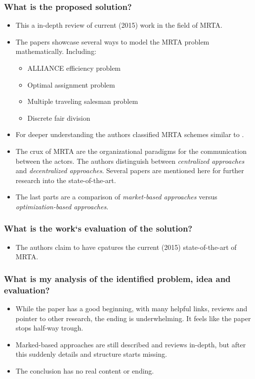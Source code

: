 \subsubsection*{What is the proposed solution?}
\begin{itemize}
    \item This a in-depth review of current (2015) work in the field of MRTA. 
    \item The papers showcase several ways to model the MRTA problem mathematically. Including: \begin{itemize}
        \item ALLIANCE efficiency problem
        \item Optimal assignment problem
        \item Multiple traveling salesman problem
        \item Discrete fair division
    \end{itemize}
    \item For deeper understanding the authors classified MRTA schemes similar to \cite{Gerkey2004}.
    \item The crux of MRTA are the organizational paradigms for the communication between the actors. The authors distinguish between \emph{centralized approaches} and \emph{decentralized approaches}. Several papers are mentioned here for further research into the state-of-the-art.
\item The last parts are a comparison of \emph{market-based approaches} versus \emph{optimization-based approaches}. 
\end{itemize}
\subsubsection*{What is the work`s evaluation of the solution?}
\begin{itemize}
    \item The authors claim to have cpatures the current (2015) state-of-the-art of MRTA.
\end{itemize}
\subsubsection*{What is my analysis of the identified problem, idea and evaluation?}
\begin{itemize}
    \item While the paper has a good beginning, with many helpful links, reviews and pointer to other research, the ending is underwhelming. It feels like the paper stops half-way trough. 
    \item Marked-based approaches are still described and reviews in-depth, but after this suddenly details and structure starts missing.
    \item The conclusion has no real content or ending.
\end{itemize}
